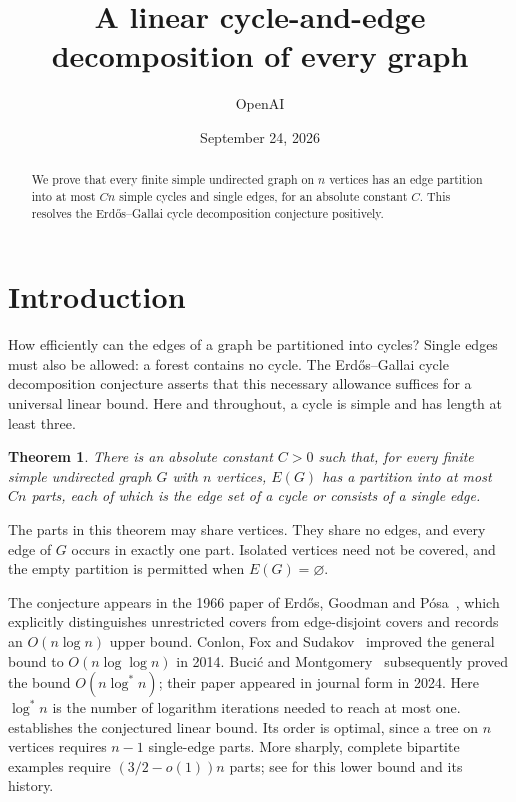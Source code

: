 \documentclass[11pt]{article}
\title{A linear cycle-and-edge decomposition of every graph}
\author{OpenAI}
\date{September 24, 2026}
\numberwithin{equation}{section}
\newtheorem{theorem}{Theorem}[section]
\theoremstyle{definition}
\theoremstyle{remark}
\begin{document}
\maketitle

\begin{abstract}
We prove that every finite simple undirected graph on \(n\) vertices
has an edge partition into at most \(Cn\) simple cycles and single
edges, for an absolute constant \(C\). This resolves the
Erd\H{o}s--Gallai cycle decomposition conjecture positively.
\end{abstract}

\section{Introduction}\label{sec:introduction}

How efficiently can the edges of a graph be partitioned into cycles?
Single edges must also be allowed: a forest contains no cycle.
The Erd\H{o}s--Gallai cycle decomposition conjecture asserts that this
necessary allowance suffices for a universal linear bound.
Here and throughout, a cycle is simple and has length at least three.

\begin{theorem}\label{thm:main}
There is an absolute constant \(C>0\) such that, for every finite
simple undirected graph \(G\) with \(n\) vertices, \(E(G)\) has a
partition into at most \(Cn\) parts, each of which is the edge set of
a cycle or consists of a single edge.
\end{theorem}

The parts in this theorem may share vertices. They share no edges,
and every edge of \(G\) occurs in exactly one part. Isolated vertices
need not be covered, and the empty partition is permitted when
\(E(G)=\varnothing\).

The conjecture appears in the 1966 paper of Erd\H{o}s, Goodman and
P\'osa~\cite[Section~5]{EGP1966}, which explicitly distinguishes
unrestricted covers from edge-disjoint covers and records an
\(O(n\log n)\) upper bound. Conlon, Fox and
Sudakov~\cite{CFS2014} improved the general bound to
\(O(n\log\log n)\) in 2014. Buci\'c and
Montgomery~\cite{BM2024} subsequently proved the bound
\(O(n\log^*n)\); their paper appeared in journal form in 2024.
Here \(\log^*n\) is the number of logarithm iterations needed to
reach at most one.  establishes the conjectured
linear bound. Its order is optimal, since a tree on \(n\) vertices
requires \(n-1\) single-edge parts. More sharply, complete bipartite
examples require \((3/2-o(1))n\) parts; see
\cite[Section~6]{BM2024} for this lower bound and its history.
\end{document}
